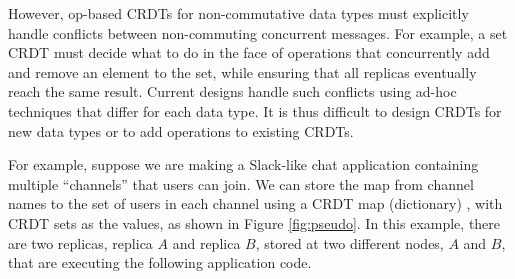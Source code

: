 \documentclass[acmsmall,nonacm]{acmart}
\theoremstyle{plain}
\theoremstyle{definition}
\begin{document}
However, op-based CRDTs for non-commutative data types must explicitly handle conflicts between non-commuting concurrent messages.  For example, a set CRDT must decide what to do in the face of operations that concurrently add and remove an element to the set, while ensuring that all replicas eventually reach the same result.  Current designs handle such conflicts using ad-hoc techniques that differ for each data type.  It is thus difficult to design CRDTs for new data types or to add operations to existing CRDTs.

For example, suppose we are making a Slack-like chat application containing multiple ``channels'' that users can join.  We can store the map from channel names to the set of users in each channel using a CRDT map (dictionary) \cite{antidote, riak_datatypes}, with CRDT sets as the values, as shown in Figure \ref{fig:pseudo}.  In this example, there are two replicas, replica $A$ and replica $B$, stored at two different nodes, $A$ and $B$, that are executing the following application code.
\end{document}
